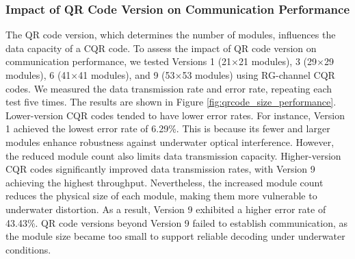 \documentclass[preprint,12pt]{elsarticle}
\begin{document}
\subsubsection{Impact of QR Code Version on Communication Performance}

The QR code version, which determines the number of modules, influences the data capacity of a CQR code. To assess the impact of QR code version on  communication performance, we tested Versions 1 (21$\times$21 modules), 3 (29$\times$29 modules), 6 (41$\times$41 modules), and 9 (53$\times$53 modules) using RG-channel CQR codes. We measured the data transmission rate and error rate, repeating each test five times. The results are shown in Figure \ref{fig:qrcode_size_performance}.
Lower-version CQR codes tended to have lower error rates. For instance, Version 1 achieved the lowest error rate of 6.29\%. This is because its fewer and larger modules enhance robustness against underwater optical interference. However, the reduced module count also limits data transmission capacity.
Higher-version CQR codes significantly improved data transmission rates, with Version 9 achieving the highest throughput. Nevertheless, the increased module count reduces the physical size of each module, making them more vulnerable to underwater distortion. As a result, Version 9 exhibited a higher error rate of 43.43\%. QR code versions beyond Version 9 failed to establish communication, as the module size became too small to support reliable decoding under underwater conditions.
\end{document}
